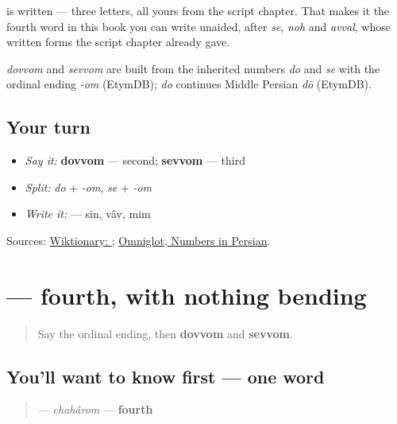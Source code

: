\textbf{} is written \textbf{} \textbf{} \textbf{} — three letters, all yours from the script chapter. That makes it the fourth word in this book you can write unaided, after \emph{se}, \emph{noh} and \emph{avval}, whose written forms the script chapter already gave.

\begin{cousinweb}
\emph{dovvom} and \emph{sevvom} are built from the inherited numbers \emph{do} and \emph{se} with the ordinal ending \emph{-om} (EtymDB); \emph{do} continues Middle Persian \emph{dō} (EtymDB).
\end{cousinweb}

\subsection*{Your turn}
\begin{itemize}
\raggedright
  \item \emph{Say it:} \textbf{dovvom} — second; \textbf{sevvom} — third
  \item \emph{Split:} \emph{do} + \emph{-om}, \emph{se} + \emph{-om}
  \item \emph{Write it:} \textbf{} — sin, vâv, mim
\end{itemize}

\begin{tcolorbox}[breakable,colback=teal!4,colframe=teal!35!black,title={Before you move on}]
Sources: \href{https://en.wiktionary.org/wiki/\%D8\%B3\%D9\%88\%D9\%85}{Wiktionary: }; \href{https://www.omniglot.com/language/numbers/persian.htm}{Omniglot, Numbers in Persian}.
\end{tcolorbox}
\section[\texorpdfstring{\fa{چهارم} (chahârom)}{چهارم (chahârom)}]{ — fourth, with nothing bending}

\label{lesson:FA-C20-chaharom}



\begin{quote}
Say the ordinal ending, then \textbf{dovvom} and \textbf{sevvom}.
\end{quote}

\subsection*{You'll want to know first — one word}
\begin{quote}
\textbf{} — \emph{chahârom} — \textbf{fourth}
\end{quote}

